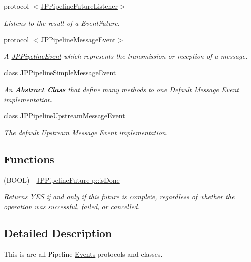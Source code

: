 \begin{DoxyCompactItemize}
protocol \hyperlink{a00023}{$<$JPPipelineFutureListener$>$}
\begin{DoxyCompactList}\small\item\em Listens to the result of a EventFuture. \item\end{DoxyCompactList}\item 
protocol \hyperlink{a00028}{$<$JPPipelineMessageEvent$>$}
\begin{DoxyCompactList}\small\item\em A \hyperlink{a00018}{JPPipelineEvent} which represents the transmission or reception of a message. \item\end{DoxyCompactList}\item 
class \hyperlink{a00030}{JPPipelineSimpleMessageEvent}
\begin{DoxyCompactList}\small\item\em An {\bfseries Abstract Class} that define many methods to one Default Message Event implementation. \item\end{DoxyCompactList}\item 
class \hyperlink{a00033}{JPPipelineUpstreamMessageEvent}
\begin{DoxyCompactList}\small\item\em The default Upstream Message Event implementation. \item\end{DoxyCompactList}\end{DoxyCompactItemize}
\subsection*{Functions}
\begin{DoxyCompactItemize}
\item 
\hypertarget{a00082_ga41065d3dada7633eef9dd75b1794511b}{
(BOOL) -\/ \hyperlink{a00082_ga41065d3dada7633eef9dd75b1794511b}{JPPipelineFuture-\/p::isDone}}
\label{a00082_ga41065d3dada7633eef9dd75b1794511b}

\begin{DoxyCompactList}\small\item\em Returns YES if and only if this future is complete, regardless of whether the operation was successful, failed, or cancelled. \item\end{DoxyCompactList}\end{DoxyCompactItemize}


\subsection{Detailed Description}
This is are all Pipeline \hyperlink{a00005}{Events} protocols and classes. 